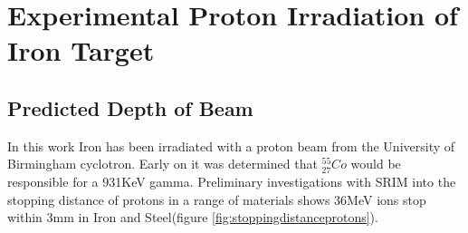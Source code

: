 \section[Experimental Irradiation - Iron]{Experimental Proton Irradiation of Iron Target}

\subsection{Predicted Depth of Beam}

In this work Iron has been irradiated with a proton beam from the University of Birmingham cyclotron.  Early on it was determined that ${}^{55}_{27}Co$ would be responsible for a 931KeV gamma.  Preliminary investigations with SRIM into the stopping distance of protons in a range of materials shows 36MeV ions stop within 3mm in Iron and Steel(figure \ref{fig:stoppingdistanceprotons}).

